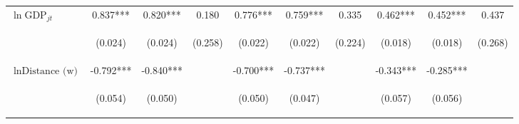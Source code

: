 \begin{center}
\begin{tabular}{lccccccccc}
$\ln\text{GDP}_{jt}$ & 0.837*** & 0.820*** & 0.180 & 0.776*** & 0.759*** & 0.335 & 0.462*** & 0.452*** & 0.437 \\
\vspace{4pt} & \begin{footnotesize}(0.024)\end{footnotesize} & \begin{footnotesize}(0.024)\end{footnotesize} & \begin{footnotesize}(0.258)\end{footnotesize} & \begin{footnotesize}(0.022)\end{footnotesize} & \begin{footnotesize}(0.022)\end{footnotesize} & \begin{footnotesize}(0.224)\end{footnotesize} & \begin{footnotesize}(0.018)\end{footnotesize} & \begin{footnotesize}(0.018)\end{footnotesize} & \begin{footnotesize}(0.268)\end{footnotesize} \\
$\ln\text{Distance (w)}$ & -0.792*** & -0.840*** &  & -0.700*** & -0.737*** &  & -0.343*** & -0.285*** &  \\
\vspace{4pt} & \begin{footnotesize}(0.054)\end{footnotesize} & \begin{footnotesize}(0.050)\end{footnotesize} & \begin{footnotesize}\end{footnotesize} & \begin{footnotesize}(0.050)\end{footnotesize} & \begin{footnotesize}(0.047)\end{footnotesize} & \begin{footnotesize}\end{footnotesize} & \begin{footnotesize}(0.057)\end{footnotesize} & \begin{footnotesize}(0.056)\end{footnotesize} & \begin{footnotesize}\end{footnotesize} \\

\end{tabular}
\end{center}

